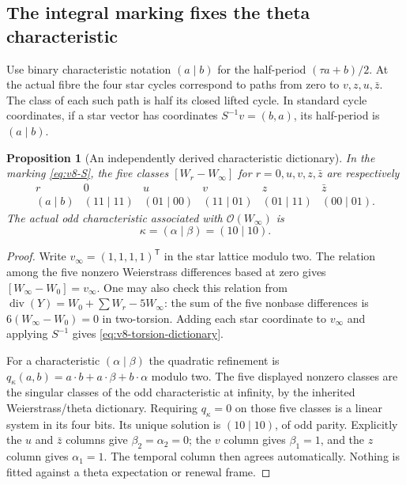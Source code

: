 \documentclass[11pt]{article}
\newtheorem{proposition}[proposition]{Proposition}
\theoremstyle{definition}
\theoremstyle{remark}
\begin{document}
\subsection{The integral marking fixes the theta characteristic}
Use binary characteristic notation $(a\mid b)$ for the half-period
$(\tau a+b)/2$. At the actual fibre the four star cycles correspond to
paths from zero to $v,z,u,\bar z$. The class of each such path is half its
closed lifted cycle. In standard cycle coordinates, if a star vector has
coordinates $S^{-1}v=(b,a)$, its half-period is $(a\mid b)$.

\begin{proposition}[An independently derived characteristic dictionary]
\label{prop:v8-characteristics}
In the marking \eqref{eq:v8-S}, the five classes $[W_r-W_\infty]$ for
$r=0,u,v,z,\bar z$ are respectively
\begin{equation}
 \begin{array}{c|ccccc}
 r&0&u&v&z&\bar z\\\hline
 (a\mid b)&(11\mid11)&(01\mid00)&(11\mid01)&(01\mid11)&(00\mid01).
 \end{array}
 \label{eq:v8-torsion-dictionary}
\end{equation}
The actual odd characteristic associated with $\mathcal O(W_\infty)$ is
\begin{equation}
 \boxed{\kappa=(\alpha\mid\beta)=(10\mid10).}
 \label{eq:v8-kappa}
\end{equation}
\end{proposition}
\begin{proof}
Write $v_\infty=(1,1,1,1)^{\mathsf T}$ in the star lattice modulo two.
The relation among the five nonzero Weierstrass differences based at zero
gives $[W_\infty-W_0]=v_\infty$. One may also check this relation from
$\operatorname{div}(Y)=W_0+\sum W_r-5W_\infty$: the sum of the five
nonbase differences is $6(W_\infty-W_0)=0$ in two-torsion. Adding each
star coordinate to $v_\infty$ and applying $S^{-1}$ gives
\eqref{eq:v8-torsion-dictionary}.

For a characteristic $(\alpha\mid\beta)$ the quadratic refinement is
$q_\kappa(a,b)=a\cdot b+a\cdot\beta+b\cdot\alpha$ modulo two.
The five displayed nonzero classes are the singular classes of the odd
characteristic at infinity, by the inherited Weierstrass/theta dictionary.
Requiring $q_\kappa=0$ on those five classes is a linear system in its four
bits. Its unique solution is $(10\mid10)$, of odd parity. Explicitly the
$u$ and $\bar z$ columns give $\beta_2=\alpha_2=0$; the $v$ column gives
$\beta_1=1$, and the $z$ column gives $\alpha_1=1$. The temporal column
then agrees automatically. Nothing is fitted against a theta expectation or
renewal frame.
\end{proof}
\end{document}
